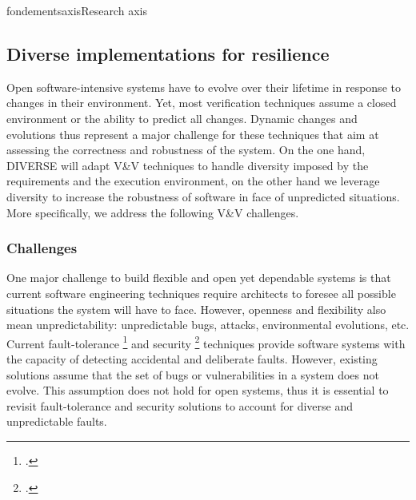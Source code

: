 \documentclass{ra2018}
\newcommand{\team}{DIVERSE}
\begin{document}
\begin{module}{fondements}{axis}{Research axis}
\subsection{Diverse implementations for resilience}
\label{sec:axis-implementation}

Open software-intensive systems have to evolve over their lifetime in response to changes in their environment. Yet, most verification techniques assume a closed environment or the ability to predict all changes. Dynamic changes and evolutions thus represent a major challenge for these techniques that aim at assessing the correctness and robustness of the system. On the one hand, \team{} will adapt V\&V techniques to handle diversity imposed by the requirements and the execution environment, on the other hand we leverage diversity to increase the robustness of software in face of unpredicted situations. More specifically, we address the following V\&V challenges.

\subsubsection*{Challenges} 


One major challenge to build flexible and open yet dependable systems is that current software engineering techniques require architects to foresee all possible  situations the system will have to face. However, openness and flexibility also mean unpredictability: unpredictable bugs, attacks, environmental evolutions, etc. Current fault-tolerance   \footcite{randell75} and security   \footcite{forrest1997building} techniques  provide software systems with the capacity of detecting   accidental and deliberate faults. However, existing solutions assume that the set of bugs or vulnerabilities in a system does not evolve. This assumption does not hold for open systems, thus it is essential to revisit fault-tolerance and security solutions to account for diverse and unpredictable faults.



\end{module}
\end{document}
